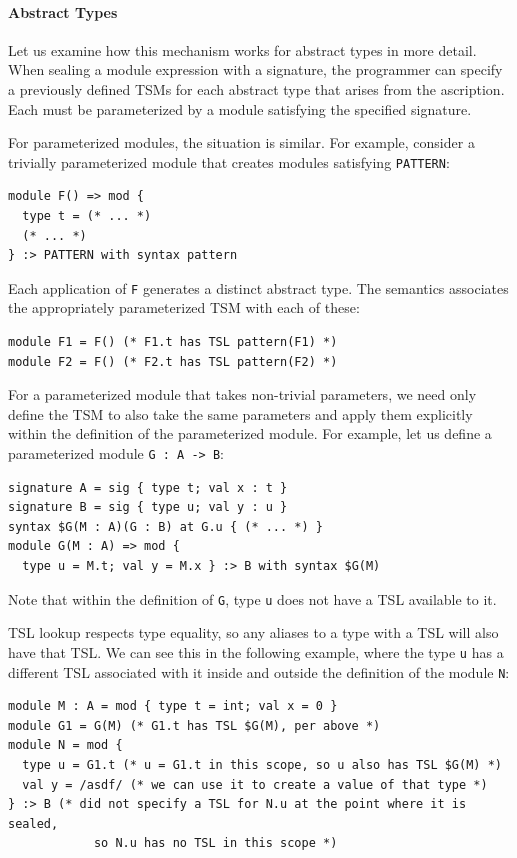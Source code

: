 \paragraph{Abstract Types}
Let us examine how this mechanism works for abstract types in more detail. When sealing a module expression with a signature, the programmer can specify a previously defined TSMs for each abstract type that arises from the ascription. Each must be parameterized by a module satisfying the specified signature.

For parameterized modules, the situation is similar. For example, consider a trivially parameterized module that creates modules satisfying \lstinline{PATTERN}:
\begin{lstlisting}[numbers=none]
module F() => mod {
  type t = (* ... *)
  (* ... *)
} :> PATTERN with syntax pattern 
\end{lstlisting}
Each application of \lstinline{F} generates a distinct abstract type. The semantics associates the appropriately parameterized TSM with each of these:
\begin{lstlisting}[numbers=none]
module F1 = F() (* F1.t has TSL pattern(F1) *)
module F2 = F() (* F2.t has TSL pattern(F2) *)
\end{lstlisting}

For a parameterized module that takes non-trivial parameters, we need only define the TSM to also take the same parameters and apply them explicitly within the definition of the parameterized module. For example, let us define a parameterized module \lstinline{G : A -> B}:
\begin{lstlisting}[numbers=none,mathescape=|]
signature A = sig { type t; val x : t }
signature B = sig { type u; val y : u }
syntax $G(M : A)(G : B) at G.u { (* ... *) }
module G(M : A) => mod { 
  type u = M.t; val y = M.x } :> B with syntax $G(M)
\end{lstlisting}
Note that within the definition of \lstinline{G}, type \lstinline{u} does not have a TSL available to it.

TSL lookup respects type equality, so any aliases to a type with a TSL will also have that TSL. We can see this in the following example, where the type \lstinline{u} has a different TSL associated with it inside and outside the definition of the module \lstinline{N}:
\begin{lstlisting}[numbers=none,mathescape=|]
module M : A = mod { type t = int; val x = 0 }
module G1 = G(M) (* G1.t has TSL $G(M), per above *)
module N = mod { 
  type u = G1.t (* u = G1.t in this scope, so u also has TSL $G(M) *)
  val y = /asdf/ (* we can use it to create a value of that type *) 
} :> B (* did not specify a TSL for N.u at the point where it is sealed, 
            so N.u has no TSL in this scope *)
\end{lstlisting}

